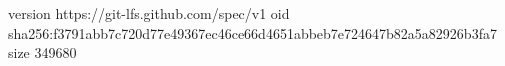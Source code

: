 version https://git-lfs.github.com/spec/v1
oid sha256:f3791abb7c720d77e49367ec46ce66d4651abbeb7e724647b82a5a82926b3fa7
size 349680
